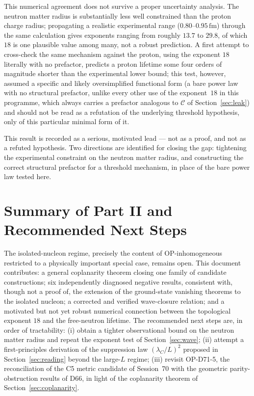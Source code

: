 \documentclass[11pt,a4paper]{article}
\newcommand{\lamC}{\lambda_C}
\begin{document}
\begin{explorbox}
This numerical agreement does not survive a proper uncertainty analysis. The neutron matter radius is substantially less well constrained than the proton charge radius; propagating a realistic experimental range ($0.80$--$0.95\,\mathrm{fm}$) through the same calculation gives exponents ranging from roughly $13.7$ to $29.8$, of which $18$ is one plausible value among many, not a robust prediction. A first attempt to cross-check the same mechanism against the proton, using the exponent $18$ literally with no prefactor, predicts a proton lifetime some four orders of magnitude shorter than the experimental lower bound; this test, however, assumed a specific and likely oversimplified functional form (a bare power law with no structural prefactor, unlike every other use of the exponent~$18$ in this programme, which always carries a prefactor analogous to $\mathcal{C}$ of Section~\ref{sec:leak}) and should not be read as a refutation of the underlying threshold hypothesis, only of this particular minimal form of it.
\end{explorbox}

This result is recorded as a serious, motivated lead --- not as a proof, and not as a refuted hypothesis. Two directions are identified for closing the gap: tightening the experimental constraint on the neutron matter radius, and constructing the correct structural prefactor for a threshold mechanism, in place of the bare power law tested here.

\section{Summary of Part II and Recommended Next Steps}

The isolated-nucleon regime, precisely the content of OP-inhomogeneous restricted to a physically important special case, remains open. This document contributes: a general coplanarity theorem closing one family of candidate constructions; six independently diagnosed negative results, consistent with, though not a proof of, the extension of the ground-state vanishing theorems to the isolated nucleon; a corrected and verified wave-closure relation; and a motivated but not yet robust numerical connection between the topological exponent $18$ and the free-neutron lifetime. The recommended next steps are, in order of tractability: (i) obtain a tighter observational bound on the neutron matter radius and repeat the exponent test of Section~\ref{sec:wave}; (ii) attempt a first-principles derivation of the suppression law $(\lamC/L)^2$ proposed in Section~\ref{sec:reading} beyond the large-$L$ regime; (iii) revisit OP-D71-5, the reconciliation of the C5 metric candidate of Session~70 with the geometric parity-obstruction results of D66, in light of the coplanarity theorem of Section~\ref{sec:coplanarity}.

\clearpage


\end{document}
